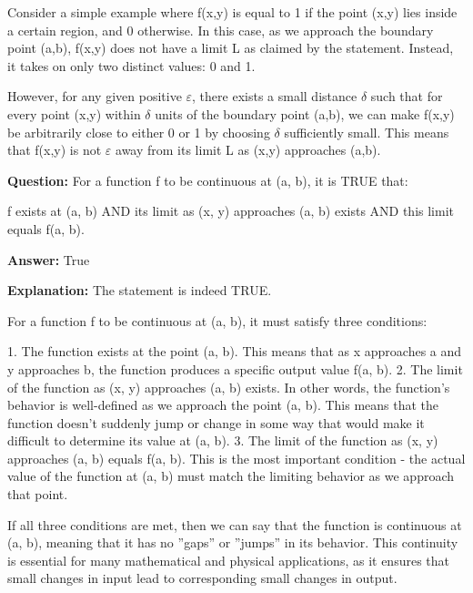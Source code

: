\documentclass{article}
\begin{document}
Consider a simple example where f(x,y) is equal to 1 if the point (x,y) lies inside a certain region, and 0 otherwise. In this case, as we approach the boundary point (a,b), f(x,y) does not have a limit L as claimed by the statement. Instead, it takes on only two distinct values: 0 and 1.

However, for any given positive \ensuremath{\varepsilon}, there exists a small distance \ensuremath{\delta} such that for every point (x,y) within \ensuremath{\delta} units of the boundary point (a,b), we can make f(x,y) be arbitrarily close to either 0 or 1 by choosing \ensuremath{\delta} sufficiently small. This means that f(x,y) is not \ensuremath{\varepsilon} away from its limit L as (x,y) approaches (a,b).
                
                \vspace{0.5cm} 
        
            
                \textbf {Question:} For a function f to be continuous at (a, b), it is TRUE that:

f exists at (a, b) AND its limit as (x, y) approaches (a, b) exists AND this limit equals f(a, b).
                
                \textbf{Answer:} True

                \textbf{Explanation:} The statement is indeed TRUE.

For a function f to be continuous at (a, b), it must satisfy three conditions:

1. The function exists at the point (a, b). This means that as x approaches a and y approaches b, the function produces a specific output value f(a, b).
2. The limit of the function as (x, y) approaches (a, b) exists. In other words, the function's behavior is well-defined as we approach the point (a, b). This means that the function doesn't suddenly jump or change in some way that would make it difficult to determine its value at (a, b).
3. The limit of the function as (x, y) approaches (a, b) equals f(a, b). This is the most important condition - the actual value of the function at (a, b) must match the limiting behavior as we approach that point.

If all three conditions are met, then we can say that the function is continuous at (a, b), meaning that it has no ''gaps'' or ''jumps'' in its behavior. This continuity is essential for many mathematical and physical applications, as it ensures that small changes in input lead to corresponding small changes in output.
                
\end{document}
